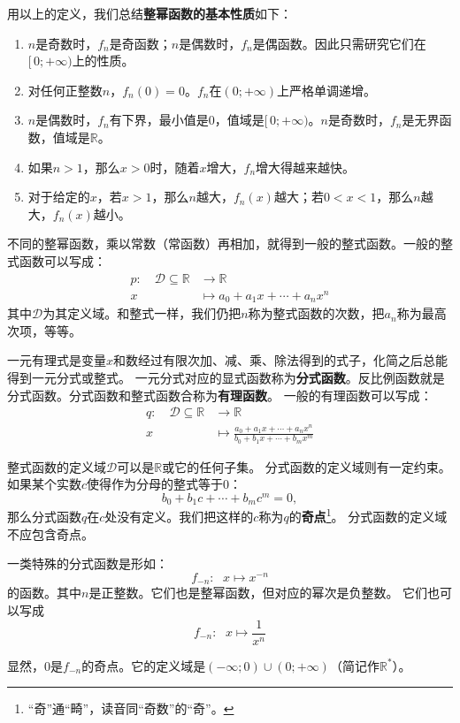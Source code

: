 \documentclass[12pt,UTF8,fontset=none]{ctexbook}
\begin{document}
用以上的定义，我们总结\textbf{整幂函数的基本性质}如下：
\begin{enumerate}
    \item $n$是奇数时，$f_n$是奇函数；$n$是偶数时，$f_n$是偶函数。因此只需研究它们在$[\,0; +\infty)$上的性质。
    \item 对任何正整数$n$，$f_n(0) = 0$。$f_n$在$(0; +\infty)$上严格单调递增。
    \item $n$是偶数时，$f_n$有下界，最小值是$0$，值域是$[\,0; +\infty)$。$n$是奇数时，$f_n$是无界函数，值域是$\mathbb{R}$。
    \item 如果$n>1$，那么$x>0$时，随着$x$增大，$f_n$增大得越来越快。
    \item 对于给定的$x$，若$x>1$，那么$n$越大，$f_n(x)$越大；若$0 < x<1$，那么$n$越大，$f_n(x)$越小。
\end{enumerate}

不同的整幂函数，乘以常数（常函数）再相加，就得到一般的整式函数。一般的整式函数可以写成：
\begin{align*}
    p: \quad \mathcal{D} \subseteq \mathbb{R} &\rightarrow \mathbb{R}  \\
    x &\mapsto a_0 + a_1 x + \cdots + a_n x^n 
\end{align*}
其中$\mathcal{D}$为其定义域。和整式一样，我们仍把$n$称为整式函数的次数，把$a_n$称为最高次项，等等。

一元有理式是变量$x$和数经过有限次加、减、乘、除法得到的式子，化简之后总能得到一元分式或整式。
一元分式对应的显式函数称为\textbf{分式函数}。反比例函数就是分式函数。分式函数和整式函数合称为\textbf{有理函数}。
一般的有理函数可以写成：
\begin{align*}
    q: \quad \mathcal{D} \subseteq \mathbb{R} &\rightarrow \mathbb{R}  \\
    x &\mapsto \frac{a_0 + a_1 x + \cdots + a_n x^n}{b_0 + b_1x + \cdots + b_mx^m} 
\end{align*}

整式函数的定义域$\mathcal{D}$可以是$\mathbb{R}$或它的任何子集。
分式函数的定义域则有一定约束。如果某个实数$c$使得作为分母的整式等于$0$：
$$ b_0 + b_1c + \cdots + b_m c^m = 0, $$
那么分式函数$q$在$c$处没有定义。我们把这样的$c$称为$q$的\textbf{奇点}\footnote{“奇”通“畸”，读音同“奇数”的“奇”。}。
分式函数的定义域不应包含奇点。

一类特殊的分式函数是形如：
$$ f_{-n} : \;\,\, x \mapsto x^{-n}$$
的函数。其中$n$是正整数。它们也是整幂函数，但对应的幂次是负整数。
它们也可以写成
$$ f_{-n} : \;\,\, x \mapsto \frac{1}{x^n}$$

显然，$0$是$f_{-n}$的奇点。它的定义域是$(-\infty; 0)\cup(0; +\infty)$（简记作$\mathbb{R}^*$）。
\end{document}
